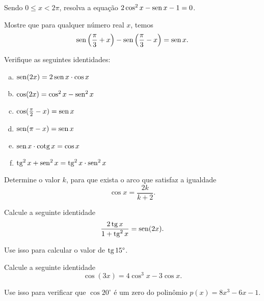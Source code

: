 \begin{secExercicios}
\begin{exer}
     Sendo $0\leqslant x < 2\pi$, resolva a equação $2\cos^2 x - \operatorname{sen} x -1 = 0$.
\end{exer}

\begin{exer}
Mostre que para qualquer número real $x$, temos
\begin{equation*}
    \operatorname{sen}\left(\frac{\pi}{3}+x\right)-\operatorname{sen}\left(\frac{\pi}{3}-x\right)=\operatorname{sen} x.
\end{equation*}
\end{exer}

\begin{exer}
    Verifique as seguintes identidades:
    \begin{enumerate}[a)]
        \item $\operatorname{sen} (2x)=2\operatorname{sen} x \cdot \cos x$
        \item $\cos(2x) = \cos^2 x- \operatorname{sen}^2 x$
        \item $\cos(\frac{\pi}{2}-x)=\operatorname{sen} x$
        \item $\operatorname{sen}(\pi - x)=\operatorname{sen} x$
        \item $\operatorname{sen} x \cdot \operatorname{cotg} x = \cos x$
        \item $\operatorname{tg}^2 x +\operatorname{sen}^2 x= \operatorname{tg}^2 x \cdot \operatorname{sen}^2 x$
    \end{enumerate}
\end{exer}

\begin{exer}
     Determine o valor $k$, para que exista o arco que satisfaz a igualdade
$$
\cos x = \dfrac{2k}{k+2}.
$$
\end{exer}

\begin{exer}
Calcule a seguinte identidade
$$\frac{2\operatorname{tg} x}{1+\operatorname{tg}^2 x}=\operatorname{sen}(2x).$$

Use isso para calcular o valor de $\operatorname{tg}15\degree$.
\end{exer}

\begin{exer}
Calcule a seguinte identidade
$$\cos(3x) = 4 \cos^{3} x - 3\cos x.$$

Use isso para verificar que $\cos 20^{\circ}$ é um zero do polinômio $p(x) = 8x^{3} -6x -1$.
\end{exer}




\end{secExercicios}
